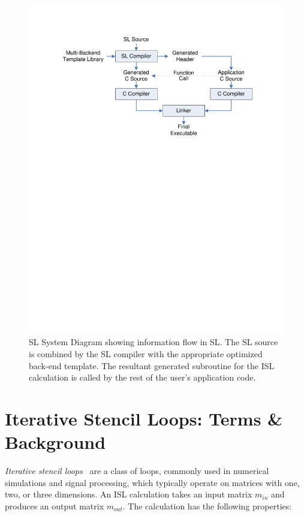 \documentclass{sig-alternate}
\begin{document}
\begin{figure}
\includegraphics[width=\columnwidth]{figures/WorkFlow}
\caption{SL System Diagram showing information flow in SL.  The SL source is
  combined by the SL compiler with the appropriate optimized back-end
  template. The resultant generated subroutine for the ISL calculation is
  called by the rest of the user's application code.}
\label{fig:SysOrg}
\end{figure}

\section{Iterative Stencil Loops: Terms \& Background}

{\em Iterative stencil loops}~\cite{li} are a class of loops, commonly used in
numerical simulations and signal processing, which typically operate on
matrices with one, two, or three dimensions.  An ISL calculation takes an
input matrix $m_{in}$ and produces an output matrix $m_{out}$.  The
calculation has the following properties:
\end{document}
